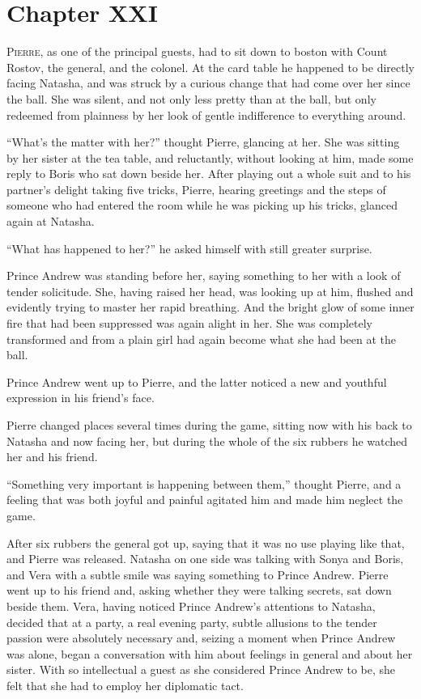 \chapter*{Chapter XXI}
\ifaudio     
{} 
\fi

\lettrine[lines=2, loversize=0.3, lraise=0]{\initfamily P}{ierre}, 
as one of the principal guests, had to sit down to boston
with Count Rostov, the general, and the colonel. At the card
table he happened to be directly facing Natasha, and was struck
by a curious change that had come over her since the ball. She
was silent, and not only less pretty than at the ball, but only
redeemed from plainness by her look of gentle indifference to
everything around.

``What's the matter with her?'' thought Pierre, glancing at
her. She was sitting by her sister at the tea table, and
reluctantly, without looking at him, made some reply to Boris who
sat down beside her. After playing out a whole suit and to his
partner's delight taking five tricks, Pierre, hearing greetings
and the steps of someone who had entered the room while he was
picking up his tricks, glanced again at Natasha.

``What has happened to her?'' he asked himself with still greater
surprise.

Prince Andrew was standing before her, saying something to her
with a look of tender solicitude. She, having raised her head,
was looking up at him, flushed and evidently trying to master her
rapid breathing. And the bright glow of some inner fire that had
been suppressed was again alight in her. She was completely
transformed and from a plain girl had again become what she had
been at the ball.

Prince Andrew went up to Pierre, and the latter noticed a new and
youthful expression in his friend's face.

Pierre changed places several times during the game, sitting now
with his back to Natasha and now facing her, but during the whole
of the six rubbers he watched her and his friend.

``Something very important is happening between them,'' thought
Pierre, and a feeling that was both joyful and painful agitated
him and made him neglect the game.

After six rubbers the general got up, saying that it was no use
playing like that, and Pierre was released. Natasha on one side
was talking with Sonya and Boris, and Vera with a subtle smile
was saying something to Prince Andrew. Pierre went up to his
friend and, asking whether they were talking secrets, sat down
beside them. Vera, having noticed Prince Andrew's attentions to
Natasha, decided that at a party, a real evening party, subtle
allusions to the tender passion were absolutely necessary and,
seizing a moment when Prince Andrew was alone, began a
conversation with him about feelings in general and about her
sister. With so intellectual a guest as she considered Prince
Andrew to be, she felt that she had to employ her diplomatic
tact.

